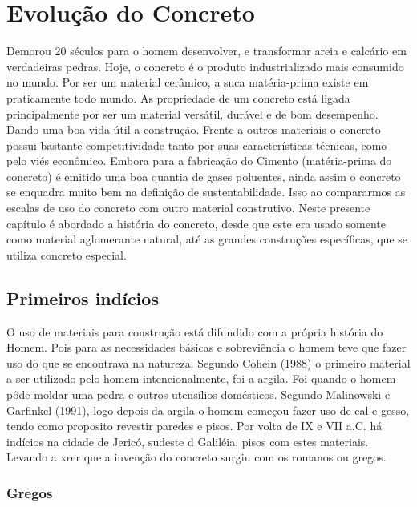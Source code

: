 \chapter{Evolução do Concreto}

Demorou 20 séculos para o homem desenvolver, e transformar areia e calcário em verdadeiras pedras. Hoje, o concreto é o produto industrializado mais consumido no mundo. Por ser um material cerâmico, a suca matéria-prima existe em praticamente todo mundo.
As propriedade de um concreto está ligada principalmente por ser um material versátil, durável e de bom desempenho. Dando uma boa vida útil a construção. Frente a outros materiais o concreto possui bastante competitividade tanto por suas características técnicas, como pelo viés econômico.
Embora para a fabricação do Cimento (matéria-prima do concreto) é emitido uma boa quantia de gases poluentes, ainda assim o concreto se enquadra muito bem na definição de sustentabilidade. Isso ao compararmos as escalas de uso do concreto com outro material construtivo.
Neste presente capítulo é abordado a história do concreto, desde que este era usado somente como material aglomerante natural, até as grandes construções específicas, que se utiliza concreto especial.

\section{Primeiros indícios}

O uso de materiais para construção está difundido com a própria história do Homem. Pois para as necessidades básicas e sobreviência o homem teve que fazer uso do que se encontrava na natureza. Segundo Cohein (1988) o primeiro material a ser utilizado pelo homem intencionalmente, foi a argila. Foi quando o homem pôde moldar uma pedra e outros utensílios domésticos.
Segundo Malinowski e Garfinkel (1991), logo depois da argila o homem começou fazer uso de cal e gesso, tendo como proposito revestir paredes e pisos. Por volta de IX e VII a.C. há indícios na cidade de Jericó, sudeste d Galiléia, pisos com estes materiais. Levando a xrer que a invenção do concreto surgiu com os romanos ou gregos.

\subsection{Gregos}

